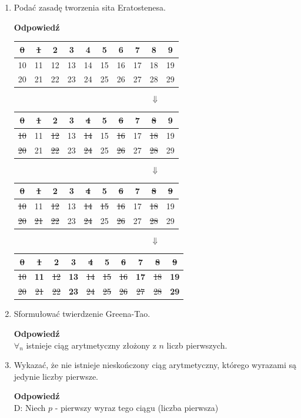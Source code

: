 \documentclass[12pt,a4paper]{article}
\newcounter{twierdzenie}
\theoremstyle{break}
\newcommand{\Odp}[1]{
		\begin{mdframed}[style=zadanie]
			\textbf{Odpowiedź}\\
			#1
		\end{mdframed}
	}
\begin{document}
\begin{enumerate}[1.]
	\item Podać zasadę tworzenia sita Eratostenesa.
	\Odp{
		\centering\begin{tabular}{|c|c|c|c|c|c|c|c|c|c|}\hline
			\sout{0}&\sout{1}&2&3&4&5&6&7&8&9\\\hline
			10&11&12&13&14&15&16&17&18&19\\\hline
			20&21&22&23&24&25&26&27&28&29\\\hline
		\end{tabular}
		$$\Downarrow$$
		\centering\begin{tabular}{|c|c|c|c|c|c|c|c|c|c|}\hline
			\sout{0}&\sout{1}&\textbf{2}&3&\sout{4}&5&\sout{6}&7&\sout{8}&9\\\hline
			\sout{10}&11&\sout{12}&13&\sout{14}&15&\sout{16}&17&\sout{18}&19\\\hline
			\sout{20}&21&\sout{22}&23&\sout{24}&25&\sout{26}&27&\sout{28}&29\\\hline
		\end{tabular}
		$$\Downarrow$$
		\centering\begin{tabular}{|c|c|c|c|c|c|c|c|c|c|}\hline
			\sout{0}&\sout{1}&\textbf{2}&\textbf{3}&\sout{4}&5&\sout{6}&7&\sout{8}&\sout{9}\\\hline
			\sout{10}&11&\sout{12}&13&\sout{14}&\sout{15}&\sout{16}&17&\sout{18}&19\\\hline
			\sout{20}&\sout{21}&\sout{22}&23&\sout{24}&25&\sout{26}&27&\sout{28}&29\\\hline
		\end{tabular}
		$$\Downarrow$$
		\centering\begin{tabular}{|c|c|c|c|c|c|c|c|c|c|}\hline
			\sout{0}&\sout{1}&\textbf{2}&\textbf{3}&\sout{4}&\textbf{5}&\sout{6}&\textbf{7}&\sout{8}&\sout{9}\\\hline
			\sout{10}&\textbf{11}&\sout{12}&\textbf{13}&\sout{14}&\sout{15}&\sout{16}&\textbf{17}&\sout{18}&\textbf{19}\\\hline
			\sout{20}&\sout{21}&\sout{22}&\textbf{23}&\sout{24}&\sout{25}&\sout{26}&\sout{27}&\sout{28}&\textbf{29}\\\hline
		\end{tabular}
	}
	
	\item Sformułować twierdzenie Greena-Tao.
	\Odp{
		$\forall_n$ istnieje ciąg arytmetyczny złożony z $n$ liczb pierwszych.
	}
	
	\item Wykazać, że nie istnieje nieskończony ciąg arytmetyczny, którego wyrazami są jedynie
	liczby pierwsze.
	\Odp{
		D: Niech $p$ - pierwszy wyraz tego ciągu (liczba pierwsza)
		
}
\end{enumerate}
\end{document}

